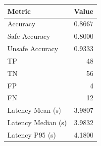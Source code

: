 \begin{table}[ht]
\centering
\begin{tabular}{lr}
\toprule
Metric & Value \\
\midrule
Accuracy & 0.8667 \\
Safe Accuracy & 0.8000 \\
Unsafe Accuracy & 0.9333 \\
TP & 48 \\
TN & 56 \\
FP & 4 \\
FN & 12 \\
Latency Mean (s) & 3.9807 \\
Latency Median (s) & 3.9832 \\
Latency P95 (s) & 4.1800 \\
\bottomrule
\end{tabular}
\end{table}